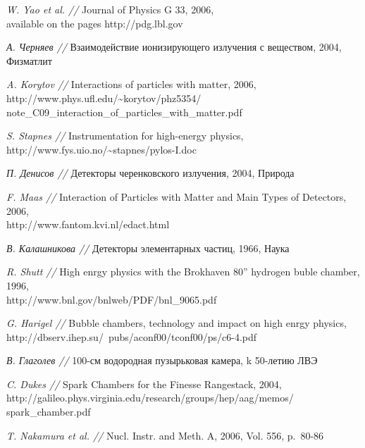 \documentclass[a4paper,12pt,titlepage]{article}
\begin{document}
\clearpage
\pagestyle{plain}
\begin{thebibliography}{99}

  \emph{W. Yao et al. //} Journal of Physics G 33, 2006, \\
  available on the pages http://pdg.lbl.gov

  \emph{А. Черняев //} Взаимодействие ионизирующего излучения с веществом,
  2004, Физматлит

  \emph{A. Korytov //} Interactions of particles with matter, 2006, \\
  http://www.phys.ufl.edu/\textasciitilde korytov/phz5354/
  note\_C09\_interaction\_of\_particles\_with\_matter.pdf

  \emph{S. Stapnes //} Instrumentation for high-energy physics, \\
  http://www.fys.uio.no/\textasciitilde stapnes/pylos-I.doc

  \emph{П. Денисов //} Детекторы черенковского излучения, 2004, Природа

  \emph{F. Maas //} Interaction of Particles with Matter and Main Types
  of Detectors, 2006, \\
  http://www.fantom.kvi.nl/edact.html

  \emph{В. Калашникова //} Детекторы элементарных частиц, 1966, Наука

  \emph{R. Shutt //} High enrgy physics with the Brokhaven 80'' hydrogen buble
  chamber, 1996, \\  http://www.bnl.gov/bnlweb/PDF/bnl\_9065.pdf

  \emph{G. Harigel //} Bubble chambers, technology and impact on high enrgy
  physics, \\ http://dbserv.ihep.su/~pubs/aconf00/tconf00/ps/c6-4.pdf

  \emph{В. Глаголев //} 100-см водородная пузырьковая камера, k 50-летию ЛВЭ

  \emph{C. Dukes //} Spark Chambers for the Finesse Rangestack, 2004,
  \\ http://galileo.phys.virginia.edu/research/groups/hep/aag/memos/
  spark\_chamber.pdf

  \emph{T. Nakamura et al. //} Nucl. Instr. and Meth. A, 2006, Vol. 556,
  p.~80-86


\end{thebibliography}
\end{document}
